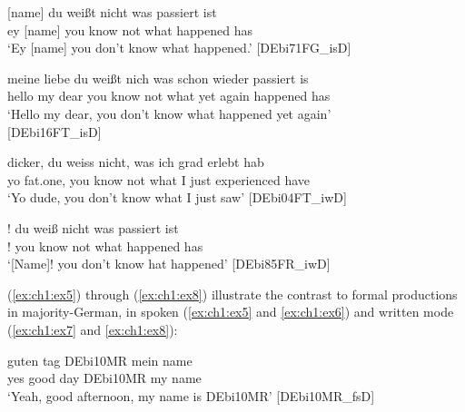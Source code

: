 \documentclass[output=paper,colorlinks,citecolor=brown]{langscibook}
\begin{document}
\ea\label{ex:ch1:ex1}

 {[name]} {du} {weißt} {nicht} was passiert ist \\
ey [name] you know not what happened has \\
\trans `Ey [name] you don't know what happened.' \hspace{\fill}[DEbi71FG\_isD]

\z

\ea\label{ex:ch1:ex2}

 {meine} {liebe} {du} {weißt} {nich} {was} {schon} {wieder} {passiert} {is} \\
hello my dear you know not what yet again happened has \\
\trans `Hello my dear, you don't know what happened yet again' \\
\hspace{\fill}[DEbi16FT\_isD]

\z

\ea\label{ex:ch1:ex3}

 {dicker,} {du} {weiss} {nicht,} {was} {ich} {grad} {erlebt} {hab} \\
yo fat.one, you know not what I just experienced have \\
\trans `Yo dude, you don't know what I just saw' \hspace{\fill}[DEbi04FT\_iwD]

\z

\ea\label{ex:ch1:ex4}

\gll [{Name}]! {du} {weiß} {nicht} {was} {passiert} {ist} \\
[name]! you know not what happened has \\
\trans `[Name]! you don't know hat happened' \hspace{\fill}[DEbi85FR\_iwD]

\z

(\ref{ex:ch1:ex5}) through (\ref{ex:ch1:ex8}) illustrate the contrast to formal productions in majority\hyp German, in spoken (\ref{ex:ch1:ex5} and \ref{ex:ch1:ex6}) and written mode (\ref{ex:ch1:ex7} and \ref{ex:ch1:ex8}):

\ea\label{ex:ch1:ex5} 

 {guten} {tag} {DEbi10MR} {mein} {name} \\
yes good day DEbi10MR my name \\
\trans `Yeah, good afternoon, my name is DEbi10MR' \hspace{\fill}[DEbi10MR\_fsD]

\z
\end{document}
